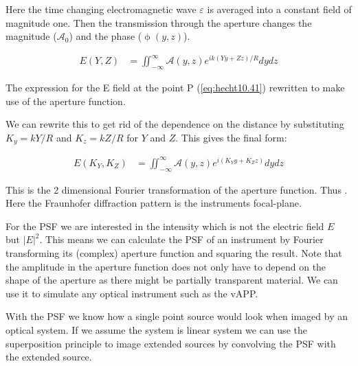 Here the time changing electromagnetic wave $\varepsilon$ is averaged into a constant field of magnitude one. Then the transmission through the aperture changes the magnitude ($\mathscr{A}_0$) and the phase ($\upphi(y,z)$).

\begin{subequations}[resume]
  \begin{align}
    E(Y,Z) &= \iint_{-\infty}^{\infty} \mathscr{A}(y,z) e^{ik(Yy+Zz)/R} dydz%
    \label{eq:hecht:2}
  \end{align}
\end{subequations}

The expression for the E field at the point P (\autoref{eq:hecht10.41}) rewritten to make use of the aperture function.

We can rewrite this to get rid of the dependence on the distance by substituting $K_y = kY/R$ and $K_z = kZ/R$ for $Y$ and $Z$. This gives the final form: 

\begin{subequations}[resume]
  \begin{align}
    E(K_Y,K_Z) &= \iint_{-\infty}^{\infty} \mathscr{A}(y,z) e^{i(K_Yy+K_Zz)} dydz%
    \label{eq:hecht:3}
  \end{align}
\end{subequations}

This is the 2 dimensional Fourier transformation of the aperture function. Thus  \cite{hecht}. Here the Fraunhofer diffraction pattern is the instruments focal-plane.

For the \ac{PSF} we are interested in the intensity which is not the electric field $E$ but ${|E|}^2$. This means we can calculate the \ac{PSF} of an instrument by Fourier transforming its (complex) aperture function and squaring the result. Note that the amplitude in the aperture function does not only have to depend on the shape of the aperture as there might be partially transparent material. We can use it to simulate any optical instrument such as the \acf*{vAPP}.

With the \ac{PSF} we know how a single point source would look when imaged by an optical system. If we assume the system is linear system we can use the superposition principle to image extended sources by convolving the \ac{PSF} with the extended source. 

